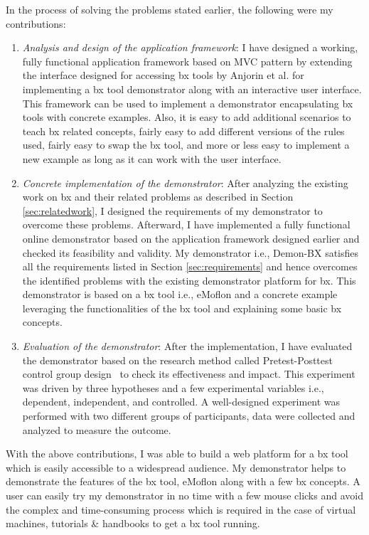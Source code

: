 In the process of solving the problems stated earlier, the following were my contributions:
\begin{enumerate}
	\item {\textit{Analysis and design of the application framework}: I have designed a working, fully functional application framework based on MVC pattern by extending the interface designed for accessing bx tools by Anjorin et al. \cite{benchmarx-reload} for implementing a bx tool demonstrator along with an interactive user interface. This framework can be used to implement a demonstrator encapsulating bx tools with concrete examples. Also, it is easy to add additional scenarios to teach bx related concepts, fairly easy to add different versions of the rules used, fairly easy to swap the bx tool, and more or less easy to implement a new example as long as it can work with the user interface.}
    \item {\textit{Concrete implementation of the demonstrator}: After analyzing the existing work on bx and their related problems as described in Section \ref{sec:relatedwork}, I designed the requirements of my demonstrator to overcome these problems. Afterward, I have implemented a fully functional online demonstrator based on the application framework designed earlier and checked its feasibility and validity. My demonstrator i.e., Demon-BX satisfies all the requirements listed in Section \ref{sec:requirements} and hence overcomes the identified problems with the existing demonstrator platform for bx. This demonstrator is based on a bx tool i.e., eMoflon and a concrete example leveraging the functionalities of the bx tool and explaining some basic bx concepts.}
    \item {\textit{Evaluation of the demonstrator}: After the implementation, I have evaluated the demonstrator based on the research method called Pretest-Posttest control group design~\cite{expandquasiexpdesign} to check its effectiveness and impact. This experiment was driven by three hypotheses and a few experimental variables i.e., dependent, independent, and controlled. A well-designed experiment was performed with two different groups of participants, data were collected and analyzed to measure the outcome.}
	
\end{enumerate}

With the above contributions, I was able to build a web platform for a bx tool which is easily accessible to a widespread audience. My demonstrator helps to demonstrate the features of the bx tool, eMoflon along with a few bx concepts. A user can easily try my demonstrator in no time with a few mouse clicks and avoid the complex and time-consuming process which is required in the case of virtual machines, tutorials \& handbooks to get a bx tool running. 


